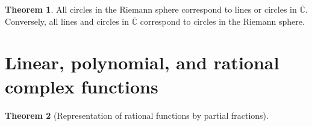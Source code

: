 \documentclass[aps,pra,showpacs,notitlepage,onecolumn,superscriptaddress,nofootinbib]{revtex4-1}
\theoremstyle{definition}
\newtheorem{theorem}{Theorem}[section]
\begin{document}
\begin{theorem}
  All circles in the Riemann sphere correspond to lines or circles in $\overline{\mathbb{C}}$. Conversely, all lines and
  circles in $\overline{\mathbb{C}}$ correspond to circles in the Riemann sphere.
\end{theorem}

\section{Linear, polynomial, and rational complex functions}

\begin{theorem}[Representation of rational functions by partial fractions]

  \end{theorem}
\end{document}
